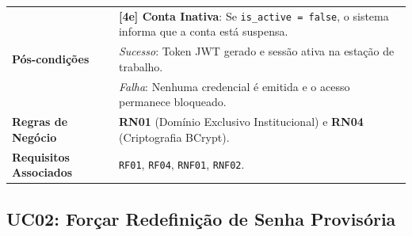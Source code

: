 \begin{table}[!ht]
\begin{tabularx}{\textwidth}{p{3.5cm} X}
& \textbf{[4e] Conta Inativa}: Se \texttt{is\_active = false}, o sistema informa que a conta está suspensa. \\
\textbf{Pós-condições} & 
\textit{Sucesso}: Token JWT gerado e sessão ativa na estação de trabalho.\\
& \textit{Falha}: Nenhuma credencial é emitida e o acesso permanece bloqueado. \\
\textbf{Regras de Negócio} & \textbf{RN01} (Domínio Exclusivo Institucional) e \textbf{RN04} (Criptografia BCrypt). \\
\textbf{Requisitos Associados} & \texttt{RF01}, \texttt{RF04}, \texttt{RNF01}, \texttt{RNF02}. \\
\bottomrule
\end{tabularx}
\end{table}

\subsection{UC02: Forçar Redefinição de Senha Provisória}
\label{uc02_especificacao}

